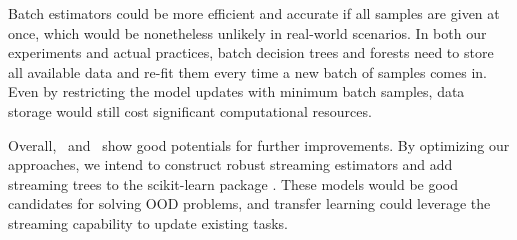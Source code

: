 Batch estimators could be more efficient and accurate if all samples are given at once, which would be nonetheless unlikely in real-world scenarios. In both our experiments and actual practices, batch decision trees and forests need to store all available data and re-fit them every time a new batch of samples comes in. Even by restricting the model updates with minimum batch samples, data storage would still cost significant computational resources. 

Overall, \SDT~and \SDF~show good potentials for further improvements. By optimizing our approaches, we intend to construct robust streaming estimators and add streaming trees to the scikit-learn package \citep{scikit-learn}. These models would be good candidates for solving OOD problems, and transfer learning could leverage the streaming capability to update existing tasks.